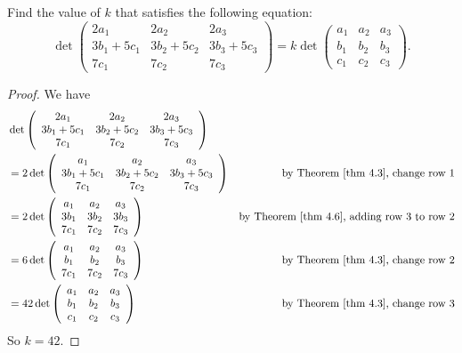 \begin{exercise} \label{exercise 4.2.3}
Find the value of \(k\) that satisfies the following equation:
\[
    \det\left(\begin{array}{ccc}
        2 a_{1} & 2 a_{2} & 2 a_{3} \\
        3 b_{1}+5 c_{1} & 3 b_{2}+5 c_{2} & 3 b_{3}+5 c_{3} \\
        7 c_{1} & 7 c_{2} & 7 c_{3}
    \end{array}\right) =
    k \det\left(\begin{array}{ccc}
        a_{1} & a_{2} & a_{3} \\
        b_{1} & b_{2} & b_{3} \\
        c_{1} & c_{2} & c_{3}
    \end{array}\right).
\]
\end{exercise}

\begin{proof}
We have
\begin{align*}
    & \det\left(\begin{array}{ccc}
        2 a_{1} & 2 a_{2} & 2 a_{3} \\
        3 b_{1} + 5 c_1 & 3 b_{2} + 5 c_2 & 3 b_{3} + 5 c_3 \\
        7 c_{1} & 7 c_{2} & 7 c_{3}
    \end{array}\right) \\
    & = 2 \det\left(\begin{array}{ccc}
            a_{1} & a_{2} & a_{3} \\
            3 b_{1} + 5 c_1 & 3 b_{2} + 5 c_2 & 3 b_{3} + 5 c_3 \\
            7 c_{1} & 7 c_{2} & 7 c_{3}
        \end{array}\right) & \text{by \THM{4.3}, change row \(1\)} \\
    & = 2 \det\left(\begin{array}{ccc}
            a_{1} & a_{2} & a_{3} \\
            3 b_{1} & 3 b_{2} & 3 b_{3} \\
            7 c_{1} & 7 c_{2} & 7 c_{3}
        \end{array}\right) & \text{by \THM{4.6}, adding row \(3\) to row \(2\)} \\
    & = 6 \det\left(\begin{array}{ccc}
            a_{1} & a_{2} & a_{3} \\
            b_{1} & b_{2} & b_{3} \\
            7 c_{1} & 7 c_{2} & 7 c_{3}
        \end{array}\right) & \text{by \THM{4.3}, change row \(2\)} \\
    & = 42 \det\left(\begin{array}{ccc}
            a_{1} & a_{2} & a_{3} \\
            b_{1} & b_{2} & b_{3} \\
            c_{1} & c_{2} & c_{3}
        \end{array}\right) & \text{by \THM{4.3}, change row \(3\)}
\end{align*}
So \(k = 42\).
\end{proof}

